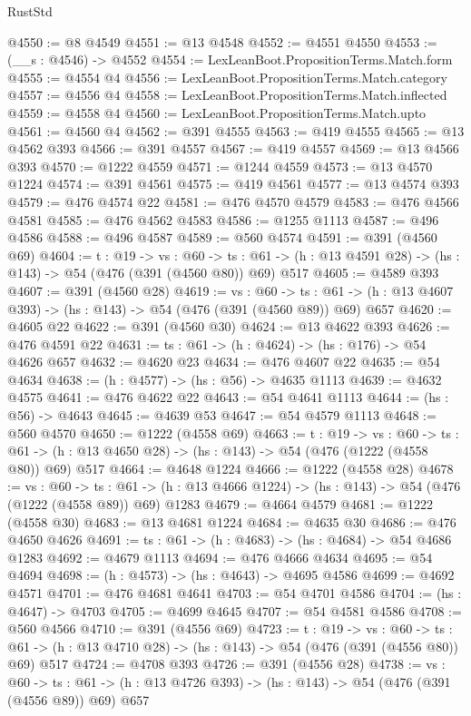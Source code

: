\begin{lexlean}{RustStd}
\begin{coremodule}
@4550 := @8 @4549
@4551 := @13 @4548
@4552 := @4551 @4550
@4553 := (__s : @4546) -> @4552
@4554 := LexLeanBoot.PropositionTerms.Match.form
@4555 := @4554 @4
@4556 := LexLeanBoot.PropositionTerms.Match.category
@4557 := @4556 @4
@4558 := LexLeanBoot.PropositionTerms.Match.inflected
@4559 := @4558 @4
@4560 := LexLeanBoot.PropositionTerms.Match.upto
@4561 := @4560 @4
@4562 := @391 @4555
@4563 := @419 @4555
@4565 := @13 @4562 @393
@4566 := @391 @4557
@4567 := @419 @4557
@4569 := @13 @4566 @393
@4570 := @1222 @4559
@4571 := @1244 @4559
@4573 := @13 @4570 @1224
@4574 := @391 @4561
@4575 := @419 @4561
@4577 := @13 @4574 @393
@4579 := @476 @4574 @22
@4581 := @476 @4570 @4579
@4583 := @476 @4566 @4581
@4585 := @476 @4562 @4583
@4586 := @1255 @1113
@4587 := @496 @4586
@4588 := @496 @4587
@4589 := @560 @4574
@4591 := @391 (@4560 @69)
@4604 := {t : @19} ->
  {vs : @60} ->
  {ts : @61} -> (h : @13 @4591 @28) -> (hs : @143) -> @54 (@476 (@391 (@4560 @80)) @69) @517
@4605 := @4589 @393
@4607 := @391 (@4560 @28)
@4619 := {vs : @60} ->
  {ts : @61} -> (h : @13 @4607 @393) -> (hs : @143) -> @54 (@476 (@391 (@4560 @89)) @69) @657
@4620 := @4605 @22
@4622 := @391 (@4560 @30)
@4624 := @13 @4622 @393
@4626 := @476 @4591 @22
@4631 := {ts : @61} -> (h : @4624) -> (hs : @176) -> @54 @4626 @657
@4632 := @4620 @23
@4634 := @476 @4607 @22
@4635 := @54 @4634
@4638 := (h : @4577) -> (hs : @56) -> @4635 @1113
@4639 := @4632 @4575
@4641 := @476 @4622 @22
@4643 := @54 @4641 @1113
@4644 := (hs : @56) -> @4643
@4645 := @4639 @53
@4647 := @54 @4579 @1113
@4648 := @560 @4570
@4650 := @1222 (@4558 @69)
@4663 := {t : @19} ->
  {vs : @60} ->
  {ts : @61} -> (h : @13 @4650 @28) -> (hs : @143) -> @54 (@476 (@1222 (@4558 @80)) @69) @517
@4664 := @4648 @1224
@4666 := @1222 (@4558 @28)
@4678 := {vs : @60} ->
  {ts : @61} -> (h : @13 @4666 @1224) -> (hs : @143) -> @54 (@476 (@1222 (@4558 @89)) @69) @1283
@4679 := @4664 @4579
@4681 := @1222 (@4558 @30)
@4683 := @13 @4681 @1224
@4684 := @4635 @30
@4686 := @476 @4650 @4626
@4691 := {ts : @61} -> (h : @4683) -> (hs : @4684) -> @54 @4686 @1283
@4692 := @4679 @1113
@4694 := @476 @4666 @4634
@4695 := @54 @4694
@4698 := (h : @4573) -> (hs : @4643) -> @4695 @4586
@4699 := @4692 @4571
@4701 := @476 @4681 @4641
@4703 := @54 @4701 @4586
@4704 := (hs : @4647) -> @4703
@4705 := @4699 @4645
@4707 := @54 @4581 @4586
@4708 := @560 @4566
@4710 := @391 (@4556 @69)
@4723 := {t : @19} ->
  {vs : @60} ->
  {ts : @61} -> (h : @13 @4710 @28) -> (hs : @143) -> @54 (@476 (@391 (@4556 @80)) @69) @517
@4724 := @4708 @393
@4726 := @391 (@4556 @28)
@4738 := {vs : @60} ->
  {ts : @61} -> (h : @13 @4726 @393) -> (hs : @143) -> @54 (@476 (@391 (@4556 @89)) @69) @657

\end{coremodule}
\end{lexlean}
